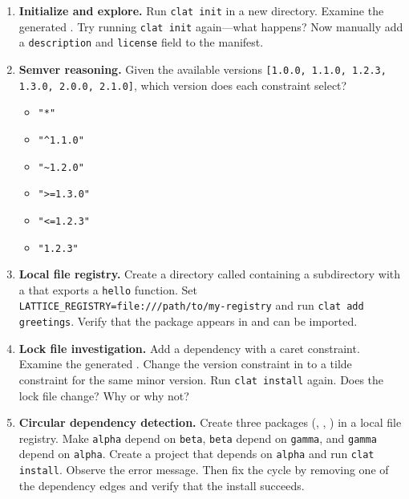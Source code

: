 \begin{enumerate}
  \item \textbf{Initialize and explore.}
  Run \lstinline|clat init| in a new directory.
  Examine the generated .
  Try running \lstinline|clat init| again---what happens?
  Now manually add a \texttt{description} and \texttt{license} field to the manifest.

  \item \textbf{Semver reasoning.}
  Given the available versions \texttt{[1.0.0, 1.1.0, 1.2.3, 1.3.0, 2.0.0, 2.1.0]}, which version does each constraint select?
  \begin{itemize}[nosep]
    \item \lstinline|"*"|
    \item \lstinline|"^1.1.0"|
    \item \lstinline|"~1.2.0"|
    \item \lstinline|">=1.3.0"|
    \item \lstinline|"<=1.2.3"|
    \item \lstinline|"1.2.3"|
  \end{itemize}

  \item \textbf{Local file registry.}
  Create a directory called  containing a subdirectory  with a  that exports a \lstinline|hello| function.
  Set \lstinline|LATTICE_REGISTRY=file:///path/to/my-registry| and run \lstinline|clat add greetings|.
  Verify that the package appears in  and can be imported.

  \item \textbf{Lock file investigation.}
  Add a dependency with a caret constraint.
  Examine the generated .
  Change the version constraint in  to a tilde constraint for the same minor version.
  Run \lstinline|clat install| again.
  Does the lock file change?
  Why or why not?

  \item \textbf{Circular dependency detection.}
  Create three packages (, , ) in a local file registry.
  Make \texttt{alpha} depend on \texttt{beta}, \texttt{beta} depend on \texttt{gamma}, and \texttt{gamma} depend on \texttt{alpha}.
  Create a project that depends on \texttt{alpha} and run \lstinline|clat install|.
  Observe the error message.
  Then fix the cycle by removing one of the dependency edges and verify that the install succeeds.
\end{enumerate}

